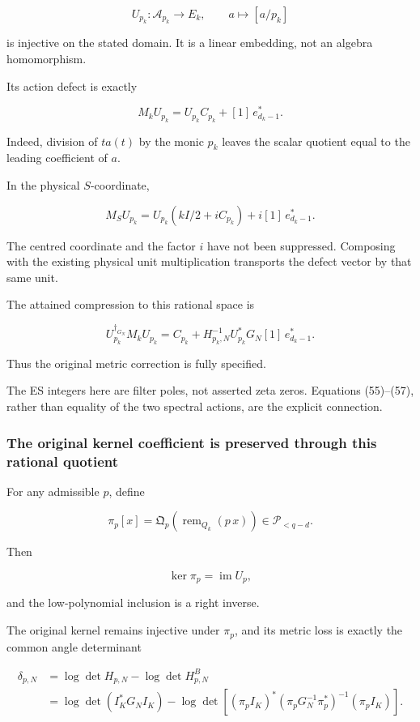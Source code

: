 \documentclass[11pt]{article}
\begin{document}
\[
U_{p_k}:\mathcal A_{p_k}\to E_k,\qquad
a\mapsto[a/p_k]
\]

is injective on the stated domain. It is a linear embedding, not an algebra homomorphism.

Its action defect is exactly

\[
\boxed{
M_kU_{p_k}
=
U_{p_k}C_{p_k}
+[1]\,e_{d_k-1}^*.
}
\tag{55}
\]

Indeed, division of \(ta(t)\) by the monic \(p_k\) leaves the scalar quotient equal to the leading coefficient of \(a\).

In the physical \(S\)-coordinate,

\[
\boxed{
M_SU_{p_k}
=
U_{p_k}(kI/2+iC_{p_k})
+i[1]\,e_{d_k-1}^*.
}
\tag{56}
\]

The centred coordinate and the factor \(i\) have not been suppressed. Composing with the existing physical unit multiplication transports the defect vector by that same unit.

The attained compression to this rational space is

\[
U_{p_k}^{\dagger_{G_N}}M_kU_{p_k}
=
C_{p_k}
+
H_{p_k,N}^{-1}U_{p_k}^*G_N[1]\,e_{d_k-1}^*.
\tag{57}
\]

Thus the original metric correction is fully specified.

The ES integers here are filter poles, not asserted zeta zeros. Equations (55)--(57), rather than equality of the two spectral actions, are the explicit connection.

\subsubsection{The original kernel coefficient is preserved through this rational quotient}\label{the-original-kernel-coefficient-is-preserved-through-this-rational-quotient}

For any admissible \(p\), define

\[
\pi_p[x]
=
\mathfrak Q_p\!\left(\operatorname{rem}_{Q_k}(p\,x)\right)
\in\mathcal P_{<q-d}.
\]

Then

\[
\ker\pi_p=\operatorname{im}U_p,
\]

and the low-polynomial inclusion is a right inverse.

The original kernel remains injective under \(\pi_p\), and its metric loss is exactly the common angle determinant

\[
\begin{aligned}
\delta_{p,N}
&=\log\det H_{p,N}-\log\det H^B_{p,N}\\
&=\log\det(I_K^*G_NI_K)
-\log\det\!\left[
(\pi_pI_K)^*
(\pi_pG_N^{-1}\pi_p^*)^{-1}
(\pi_pI_K)
\right].
\end{aligned}
\]
\end{document}
